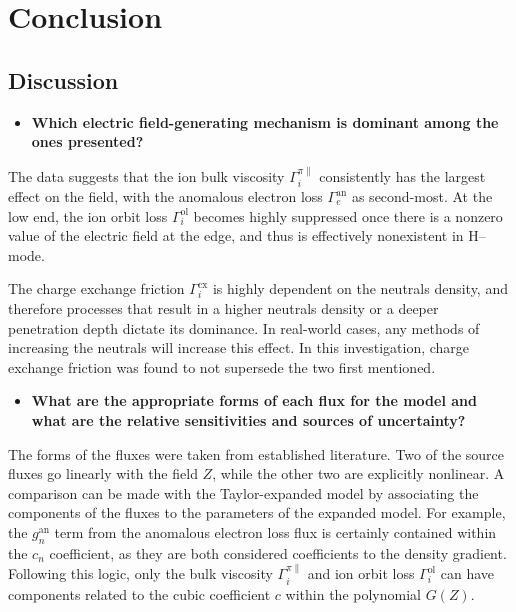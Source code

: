 \chapter{Conclusion} \label{chapter:conclusion}
\section{Discussion} \label{sec:discussion}
\begin{itemize}
	\item \textbf{Which electric field-generating mechanism is dominant among the ones presented?}
\end{itemize}

The data suggests that the ion bulk viscosity $\Gamma_i^{\pi\parallel}$ consistently has the largest effect on the field, with the anomalous electron loss $\Gamma_e^\text{an}$ as second-most.
At the low end, the ion orbit loss $\Gamma_i^\text{ol}$ becomes highly suppressed once there is a nonzero value of the electric field at the edge, and thus is effectively nonexistent in H--mode.

The charge exchange friction $\Gamma_i^\text{cx}$ is highly dependent on the neutrals density, and therefore processes that result in a higher neutrals density or a deeper penetration depth dictate its dominance.
In real-world cases, any methods of increasing the neutrals will increase this effect.
In this investigation, charge exchange friction was found to not supersede the two first mentioned.

\begin{itemize}
	\item \textbf{What are the appropriate forms of each flux for the model and what are the relative sensitivities and sources of uncertainty?}
\end{itemize}

The forms of the fluxes were taken from established literature.
Two of the source fluxes go linearly with the field $Z$, while the other two are explicitly nonlinear.
A comparison can be made with the Taylor-expanded model by associating the components of the fluxes to the parameters of the expanded model.
For example, the $g_n^\text{an}$ term from the anomalous electron loss flux is certainly contained within the $c_n$ coefficient, as they are both considered coefficients to the density gradient.
Following this logic, only the bulk viscosity $\Gamma_i^{\pi\parallel}$ and ion orbit loss $\Gamma_i^\text{ol}$ can have components related to the cubic coefficient $c$ within the polynomial $G(Z)$.

